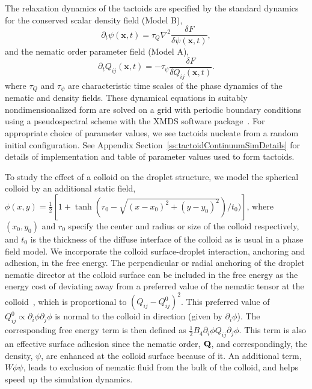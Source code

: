 \documentclass[%
 aip,
 amsmath,amssymb,
 reprint,%
]{revtex4-1}
\begin{document}
The relaxation dynamics of the tactoids are specified by the standard dynamics for the conserved scalar density field (Model B),
\begin{equation}
\partial_t \psi(\textbf{x},t) = \tau_{Q} \nabla^2 \frac{\delta F}{\delta \psi(\textbf{x},t)},
\end{equation}
and the nematic order parameter field (Model A),
\begin{equation}
\partial_t Q_{ij}(\textbf{x},t) = - \tau_{\psi} \frac{\delta F}{\delta Q_{ij}(\textbf{x},t)}.
\end{equation}
where $\tau_Q$ and $\tau_\psi$ are characteristic time scales of the phase dynamics of the nematic and density fields. 
These dynamical equations in suitably nondimensionalized form are solved on a grid with periodic boundary conditions using a pseudospectral scheme with the XMDS software package~\cite{XMDS}. For appropriate choice of parameter values, we see tactoids nucleate from a random initial configuration. See Appendix Section~\ref{ss:tactoidContinuumSimDetails} for details of implementation and table of parameter values used to form tactoids.


To study the effect of a colloid on the droplet structure, we model the spherical colloid by an additional static field, $\phi(x,y) = \frac{1}{2}\left[1 + \tanh(r_{0} - \sqrt{(x - x_{0})^2 + (y - y_{0})^2})/t_{0})\right]$, where $(x_{0}, y_{0})$ and $r_{0}$ specify the center and radius or size of the colloid respectively, and $t_{0}$ is the thickness of the diffuse interface of the colloid as is usual in a phase field model. We incorporate the colloid surface-droplet interaction, anchoring and adhesion, in the free energy. The perpendicular or radial anchoring of the droplet nematic director at the colloid surface can be included in the free energy as the energy cost of deviating away from a preferred value of the nematic tensor at the colloid~\cite{RapiniPapoular69, NobiliDurand92}, which is proportional to $( Q_{ij} -  Q^{0}_{ij})^{2}$. This preferred value of $Q^{0}_{ij} \propto \partial_{i} \phi \partial_{j} \phi$ is normal to the colloid in direction (given by $\partial_{i} \phi$). 
The corresponding free energy term is then defined as $\frac{1}{2} B_4 \partial_{i} \phi Q_{ij} \partial_{j}\phi$. This term is also an effective surface adhesion since the nematic order, ${\bf Q}$, and correspondingly, the density, $\psi$, are enhanced at the colloid surface because of it. An additional term, $W\phi\psi$, leads to exclusion of nematic fluid from the bulk of the colloid, and helps speed up the simulation dynamics.
\end{document}
